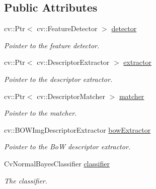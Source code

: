 \subsection*{Public Attributes}
\begin{DoxyCompactItemize}
\item 
\hypertarget{classBoWClassifier_a54b81ea8a299f93c88019a47ec271995}{
cv::Ptr$<$ cv::FeatureDetector $>$ \hyperlink{classBoWClassifier_a54b81ea8a299f93c88019a47ec271995}{detector}}
\label{classBoWClassifier_a54b81ea8a299f93c88019a47ec271995}

\begin{DoxyCompactList}\small\item\em Pointer to the feature detector. \item\end{DoxyCompactList}\item 
\hypertarget{classBoWClassifier_af4470ffa8f65afd086d5835806bee599}{
cv::Ptr$<$ cv::DescriptorExtractor $>$ \hyperlink{classBoWClassifier_af4470ffa8f65afd086d5835806bee599}{extractor}}
\label{classBoWClassifier_af4470ffa8f65afd086d5835806bee599}

\begin{DoxyCompactList}\small\item\em Pointer to the descriptor extractor. \item\end{DoxyCompactList}\item 
\hypertarget{classBoWClassifier_a6308de14d1365161b0de07fd22ecb90d}{
cv::Ptr$<$ cv::DescriptorMatcher $>$ \hyperlink{classBoWClassifier_a6308de14d1365161b0de07fd22ecb90d}{matcher}}
\label{classBoWClassifier_a6308de14d1365161b0de07fd22ecb90d}

\begin{DoxyCompactList}\small\item\em Pointer to the matcher. \item\end{DoxyCompactList}\item 
\hypertarget{classBoWClassifier_a84a9aca3e3dd05848b88502f4d04a584}{
cv::BOWImgDescriptorExtractor \hyperlink{classBoWClassifier_a84a9aca3e3dd05848b88502f4d04a584}{bowExtractor}}
\label{classBoWClassifier_a84a9aca3e3dd05848b88502f4d04a584}

\begin{DoxyCompactList}\small\item\em Pointer to the BoW descriptor extractor. \item\end{DoxyCompactList}\item 
\hypertarget{classBoWClassifier_ae760df15198c010c4032c4fdfd2c7b69}{
CvNormalBayesClassifier \hyperlink{classBoWClassifier_ae760df15198c010c4032c4fdfd2c7b69}{classifier}}
\label{classBoWClassifier_ae760df15198c010c4032c4fdfd2c7b69}

\begin{DoxyCompactList}\small\item\em The classifier. \item\end{DoxyCompactList}\end{DoxyCompactItemize}


